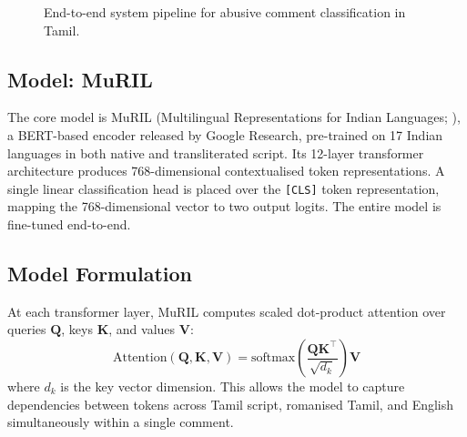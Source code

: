 \documentclass[11pt]{article}
\begin{document}
\begin{figure}[h]
\centering
{}
\caption{End-to-end system pipeline for abusive comment classification in Tamil.}
\label{fig:pipeline}
\end{figure}

\subsection{Model: MuRIL}

The core model is MuRIL (Multilingual Representations for Indian Languages; \citealt{khanuja2021}), a
BERT-based encoder released by Google Research,
pre-trained on 17 Indian languages in both native
and transliterated script. Its 12-layer transformer
architecture produces 768-dimensional contextualised token representations. A single linear classification head is placed over the \texttt{[CLS]} token representation, mapping the 768-dimensional vector
to two output logits. The entire model is fine-tuned
end-to-end.

\subsection{Model Formulation}

At each transformer layer, MuRIL computes scaled
dot-product attention over queries $\mathbf{Q}$, keys $\mathbf{K}$, and
values $\mathbf{V}$:
\begin{equation}
\text{Attention}(\mathbf{Q}, \mathbf{K}, \mathbf{V}) = \text{softmax}\!\left(\frac{\mathbf{Q}\mathbf{K}^\top}{\sqrt{d_k}}\right)\mathbf{V}
\end{equation}
where $d_k$ is the key vector dimension. This allows
the model to capture dependencies between tokens
across Tamil script, romanised Tamil, and English
simultaneously within a single comment.
\end{document}
